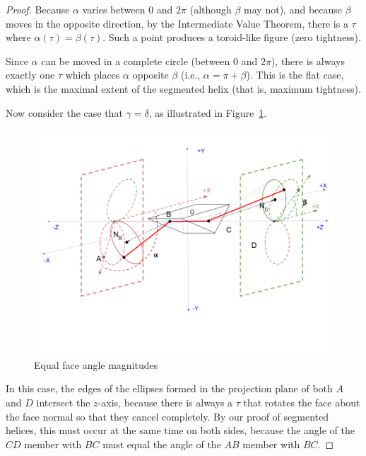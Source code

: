 \documentclass[mathematics,article,submit,pdftex,moreauthors]{Definitions/mdpi}
\begin{document}
\begin{proof}
    Because $\alpha$ varies between $0$ and $2\pi$ (although
    $\beta$ may not), and because $\beta$ moves in the opposite direction,
    by the Intermediate Value Theorem, there is a $\tau$ where
    $\alpha(\tau) = \beta(\tau)$. Such a point produces a toroid-like
    figure (zero tightness).

    Since $\alpha$ can be moved in a complete circle (between 0 and
    $2\pi$), there is always
    exactly one
    $\tau$ which places $\alpha$ opposite $\beta$
    (i.e., $\alpha = \pi + \beta$). This is the flat case, which
    is the maximal extent of the segmented helix (that is, maximum tightness).

    Now consider the case that $\gamma = \delta$, as illustrated
    in Figure~\ref{fig:twistspectrumequal}.

    \begin{figure}
      \centering
  \captionsetup{justification=centering}
     \includegraphics[width=10 cm]{figures/TwistSpectrumEqual.png}
     \caption{Equal face angle magnitudes}
  \label{fig:twistspectrumequal}
    \end{figure}
\unskip


    In this case, the edges of the ellipses formed in the projection plane of both $A$ and $D$
    intersect
    the $z$-axis, because there is always a $\tau$ that rotates
    the face about the face normal so that they cancel completely. By our
    proof of segmented helices, this must occur at the same time on both sides,
    because the angle of the $CD$ member with $BC$ must equal the angle of the $AB$ member
    with $BC$.


\end{proof}
\end{document}
